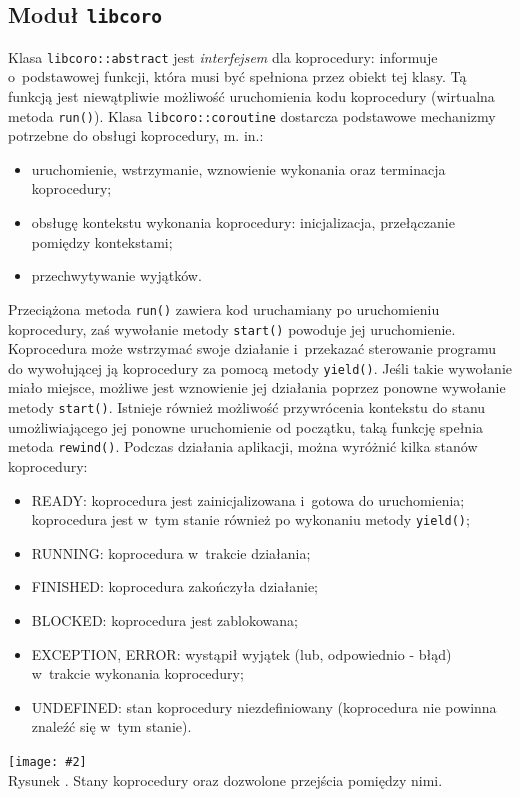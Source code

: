 \documentclass[12pt]{mwart}
\newcommand{\code}{\texttt}
\newcommand{\procbr}{()}
\newcounter{figmain}
\newcommand{\myownfigure}[4]{ \newcounter{#1} \setcounter{#1}{\value{figmain}} \addtocounter{figmain}{1} \begin{center} \label{fig:#1} \centering \texttt{[image: \#2]}\\ \nopagebreak[4] Rysunek \arabic{#1}. #3. \end{center}}
\begin{document}
\subsection{Moduł \code{libcoro}}
\label{sec:coroutine}
%
\indent
	Klasa \code{libcoro::abstract} jest \emph{interfejsem} dla koprocedury: informuje o~podstawowej funkcji, która musi być spełniona
	przez obiekt tej klasy. Tą funkcją jest niewątpliwie możliwość uruchomienia kodu koprocedury (wirtualna metoda \code{run()}).
	Klasa \code{libcoro::coroutine} dostarcza podstawowe mechanizmy potrzebne do obsługi koprocedury, m. in.:
	\begin{itemize}
		\item uruchomienie, wstrzymanie, wznowienie wykonania oraz terminacja koprocedury;
		\item obsługę kontekstu wykonania koprocedury: inicjalizacja, przełączanie pomiędzy kontekstami;
		\item przechwytywanie wyjątków.
	\end{itemize}
	Przeciążona metoda \code{run()} zawiera kod uruchamiany po uruchomieniu koprocedury,
	zaś wywołanie metody \code{start()} powoduje jej uruchomienie.
	Koprocedura może wstrzymać swoje działanie i~przekazać sterowanie programu do wywołującej ją koprocedury za pomocą metody \code{yield()}.
	Jeśli takie wywołanie miało miejsce, możliwe jest wznowienie jej działania poprzez ponowne wywołanie metody \code{start()}.
	Istnieje również możliwość przywrócenia kontekstu do stanu umożliwiającego jej ponowne uruchomienie od początku, taką funkcję spełnia
	metoda \code{rewind\procbr}.
	Podczas działania aplikacji, można wyróżnić kilka stanów koprocedury:
	\begin{itemize}
		\item READY: koprocedura jest zainicjalizowana i~gotowa do uruchomienia; koprocedura jest w~tym stanie również po wykonaniu metody
			\code{yield\procbr};
		\item RUNNING: koprocedura w~trakcie działania;
		\item FINISHED: koprocedura zakończyła działanie;
		\item BLOCKED: koprocedura jest zablokowana;
		\item EXCEPTION, ERROR: wystąpił wyjątek (lub, odpowiednio - błąd) w~trakcie wykonania koprocedury;
		\item UNDEFINED: stan koprocedury niezdefiniowany (koprocedura nie powinna znaleźć się w~tym stanie).
	\end{itemize}
	\begin{center}
		\myownfigure{LibcoroStates}{LibcoroStates.png}{Stany koprocedury oraz dozwolone przejścia pomiędzy nimi}{.7}
	\end{center}
\end{document}
